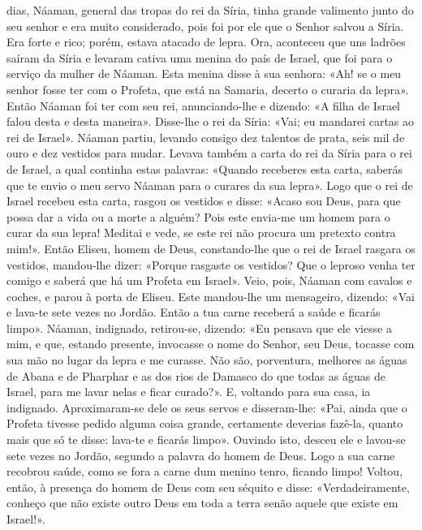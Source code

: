 \begin{paracol}{2}
{ dias, Náaman, general das tropas do rei da Síria, tinha grande valimento junto do seu senhor e era muito considerado, pois foi por ele que o Senhor salvou a Síria. Era forte e rico; porém, estava atacado de lepra. Ora, aconteceu que uns ladrões saíram da Síria e levaram cativa uma menina do país de Israel, que foi para o serviço da mulher de Náaman. Esta menina disse à sua senhora: «Ah! se o meu senhor fosse ter com o Profeta, que está na Samaria, decerto o curaria da lepra». Então Náaman foi ter com seu rei, anunciando-lhe e dizendo: «A filha de Israel falou desta e desta maneira». Disse-lhe o rei da Síria: «Vai; eu mandarei cartas ao rei de Israel». Náaman partiu, levando consigo dez talentos de prata, seis mil de ouro e dez vestidos para mudar. Levava também a carta do rei da Síria para o rei de Israel, a qual continha estas palavras: «Quando receberes esta carta, saberás que te envio o meu servo Náaman para o curares da sua lepra». Logo que o rei de Israel recebeu esta carta, rasgou os vestidos e disse: «Acaso sou Deus, para que possa dar a vida ou a morte a alguém? Pois este envia-me um homem para o curar da sua lepra! Meditai e vede, se este rei não procura um pretexto contra mim!». Então Eliseu, homem de Deus, constando-lhe que o rei de Israel rasgara os vestidos, mandou-lhe dizer: «Porque rasgaste os vestidos? Que o leproso venha ter comigo e saberá que há um Profeta em Israel». Veio, pois, Náaman com cavalos e coches, e parou à porta de Eliseu. Este mandou-lhe um mensageiro, dizendo: «Vai e lava-te sete vezes no Jordão. Então a tua carne receberá a saúde e ficarás limpo». Náaman, indignado, retirou-se, dizendo: «Eu pensava que ele viesse a mim, e que, estando presente, invocasse o nome do Senhor, seu Deus, tocasse com sua mão no lugar da lepra e me curasse. Não são, porventura, melhores as águas de Abana e de Pharphar e as dos rios de Damasco do que todas as águas de Israel, para me lavar nelas e ficar curado?». E, voltando para sua casa, ia indignado. Aproximaram-se dele os seus servos e disseram-lhe: «Pai, ainda que o Profeta tivesse pedido alguma coisa grande, certamente deverias fazê-la, quanto mais que só te disse: lava-te e ficarás limpo». Ouvindo isto, desceu ele e lavou-se sete vezes no Jordão, segundo a palavra do homem de Deus. Logo a sua carne recobrou saúde, como se fora a carne dum menino tenro, ficando limpo! Voltou, então, à presença do homem de Deus com seu séquito e disse: «Verdadeiramente, conheço que não existe outro Deus em toda a terra senão aquele que existe em Israel!».
}\end{paracol}

